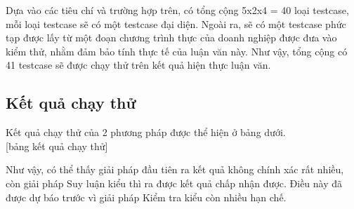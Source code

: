 Dựa vào các tiêu chí và trường hợp trên, có tổng cộng 5x2x4 = 40 loại testcase, mỗi loại testcase sẽ có một testcase đại diện. Ngoài ra, sẽ có một testcase phức tạp được lấy từ một đoạn chương trình thực của doanh nghiệp được đưa vào kiểm thử, nhằm đảm bảo tính thực tế của luận văn này. Như vậy, tổng cộng có 41 testcase sẽ được chạy thử trên kết quả hiện thực luận văn.\\

\subsection{Kết quả chạy thử}

Kết quả chạy thử của 2 phương pháp được thể hiện ở bảng dưới.\\

[bảng kết quả chạy thử]

Như vậy, có thể thấy giải pháp đầu tiên ra kết quả không chính xác rất nhiều, còn giải pháp Suy luận kiểu thì ra được kết quả chấp nhận được. Điều này đã được dự báo trước vì giải pháp Kiểm tra kiểu còn nhiều hạn chế.\\
